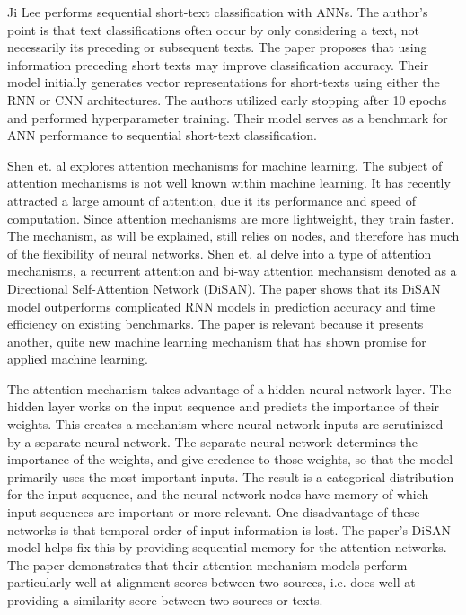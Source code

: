 Ji Lee performs sequential short-text classification with ANNs. The author's point is that text classifications often occur by only considering a text, not necessarily its preceding or subsequent texts.  The paper proposes that using information preceding short texts may improve classification accuracy.  Their model initially generates vector representations for short-texts using either the RNN or CNN architectures.  The authors utilized early stopping after 10 epochs and performed hyperparameter training.  Their model serves as a benchmark for ANN performance to sequential short-text classification.

Shen et. al explores attention mechanisms for machine learning.  The subject of attention mechanisms is not well known within machine learning.  It has recently attracted a large amount of attention, due it its performance and speed of computation.  Since attention mechanisms are more lightweight, they train faster.  The mechanism, as will be explained, still relies on nodes, and therefore has much of the flexibility of neural networks.  Shen et. al delve into a type of attention mechanisms, a recurrent attention and bi-way attention mechansism denoted as a Directional Self-Attention Network (DiSAN).  The paper shows that its DiSAN model outperforms complicated RNN models in prediction accuracy and time efficiency on existing benchmarks.  The paper is relevant because it presents another, quite new machine learning mechanism that has shown promise for applied machine learning.

The attention mechanism takes advantage of a hidden neural network layer.  The hidden layer works on the input sequence and predicts the importance of their weights.  This creates a mechanism where neural network inputs are scrutinized by a separate neural network.  The separate neural network determines the importance of the weights, and give credence to those weights, so that the model primarily uses the most important inputs.  The result is a categorical distribution for the input sequence, and the neural network nodes have memory of which input sequences are important or more relevant.  One disadvantage of these networks is that temporal order of input information is lost.  The paper's DiSAN model helps fix this by providing sequential memory for the attention networks.  The paper demonstrates that their attention mechanism models perform particularly well at alignment scores between two sources, i.e. does well at providing a similarity score between two sources or texts.

